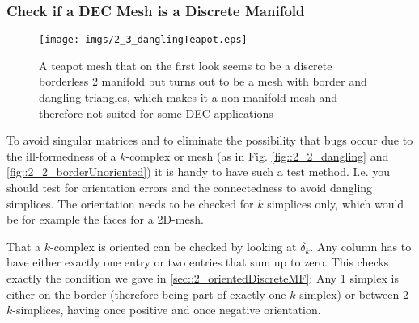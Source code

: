 \subsubsection{Check if a DEC Mesh is a Discrete Manifold}
\begin{figure}[tb]
	\begin{center}
	\texttt{[image: imgs/2\_3\_danglingTeapot.eps]}
	\end{center}
	\caption{A teapot mesh that on the first look seems to be a discrete borderless 2 manifold but turns out to be a mesh with border and dangling triangles, which makes it a non-manifold mesh and therefore not suited for some DEC applications}
\end{figure}

To avoid singular matrices and to eliminate the possibility that bugs occur due to the ill-formedness of a $k$-complex or mesh (as in Fig. \ref{fig::2_2_dangling} and \ref{fig::2_2_borderUnoriented}) it is handy to have such a test method. I.e. you should test for orientation errors and the connectedness to avoid dangling simplices.
The orientation needs to be checked for $k$ simplices only, which would be for example the faces for a 2D-mesh. 

That a $k$-complex is oriented can be checked by looking at $\delta_k$. Any column has to have either exactly one entry or two entries that sum up to zero. This checks exactly the condition we gave in \ref{sec::2_orientedDiscreteMF}: Any 1 simplex is either on the border (therefore being part of exactly one $k$ simplex) or between 2 $k$-simplices, having once positive and once negative orientation.

